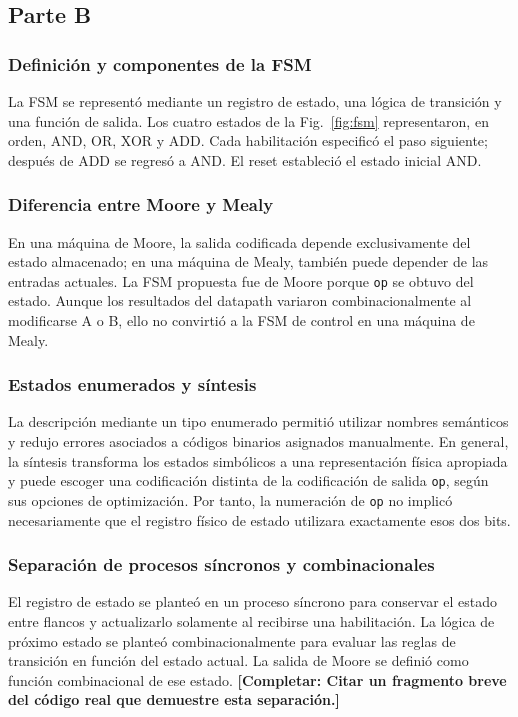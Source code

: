 \documentclass[conference]{IEEEtran}
\newcommand{\completar}[1]{\textcolor{pendiente}{\textbf{[Completar: #1]}}}
\begin{document}
\subsection{Parte B}
\subsubsection{Definición y componentes de la FSM}
La FSM se representó mediante un registro de estado, una lógica de transición y una función de salida. Los cuatro estados de la Fig.~\ref{fig:fsm} representaron, en orden, AND, OR, XOR y ADD. Cada habilitación especificó el paso siguiente; después de ADD se regresó a AND. El reset estableció el estado inicial AND.

\subsubsection{Diferencia entre Moore y Mealy}
En una máquina de Moore, la salida codificada depende exclusivamente del estado almacenado; en una máquina de Mealy, también puede depender de las entradas actuales. La FSM propuesta fue de Moore porque \texttt{op} se obtuvo del estado. Aunque los resultados del datapath variaron combinacionalmente al modificarse A o B, ello no convirtió a la FSM de control en una máquina de Mealy.

\subsubsection{Estados enumerados y síntesis}
La descripción mediante un tipo enumerado permitió utilizar nombres semánticos y redujo errores asociados a códigos binarios asignados manualmente. En general, la síntesis transforma los estados simbólicos a una representación física apropiada y puede escoger una codificación distinta de la codificación de salida \texttt{op}, según sus opciones de optimización. Por tanto, la numeración de \texttt{op} no implicó necesariamente que el registro físico de estado utilizara exactamente esos dos bits.

\subsubsection{Separación de procesos síncronos y combinacionales}
El registro de estado se planteó en un proceso síncrono para conservar el estado entre flancos y actualizarlo solamente al recibirse una habilitación. La lógica de próximo estado se planteó combinacionalmente para evaluar las reglas de transición en función del estado actual. La salida de Moore se definió como función combinacional de ese estado. \completar{Citar un fragmento breve del código real que demuestre esta separación.}
\end{document}
